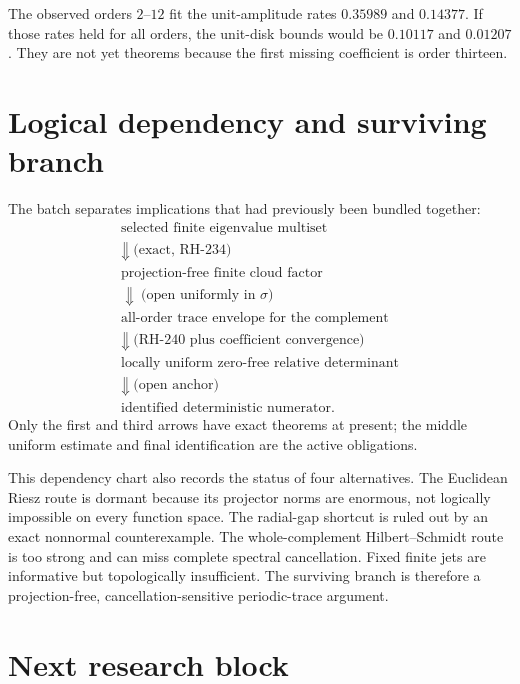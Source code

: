 \documentclass[11pt]{article}
\theoremstyle{remark}
\begin{document}
The observed orders $2$--$12$ fit the unit-amplitude rates $0.35989$ and
$0.14377$.  If those rates held for all orders, the unit-disk bounds would be
$0.10117$ and $0.01207$.  They are not yet theorems because the first missing
coefficient is order thirteen.

\section{Logical dependency and surviving branch}

The batch separates implications that had previously been bundled together:
\[
\begin{array}{c}
\text{selected finite eigenvalue multiset}\\
\Downarrow\ \text{(exact, RH-234)}\\
\text{projection-free finite cloud factor}\\
\Downarrow\ \text{(open uniformly in }\sigma\text{)}\\
\text{all-order trace envelope for the complement}\\
\Downarrow\ \text{(RH-240 plus coefficient convergence)}\\
\text{locally uniform zero-free relative determinant}\\
\Downarrow\ \text{(open anchor)}\\
\text{identified deterministic numerator.}
\end{array}
\]
Only the first and third arrows have exact theorems at present; the middle
uniform estimate and final identification are the active obligations.

This dependency chart also records the status of four alternatives.  The
Euclidean Riesz route is dormant because its projector norms are enormous,
not logically impossible on every function space.  The radial-gap shortcut
is ruled out by an exact nonnormal counterexample.  The whole-complement
Hilbert--Schmidt route is too strong and can miss complete spectral
cancellation.  Fixed finite jets are informative but topologically
insufficient.  The surviving branch is therefore a projection-free,
cancellation-sensitive periodic-trace argument.

\section{Next research block}
\end{document}
